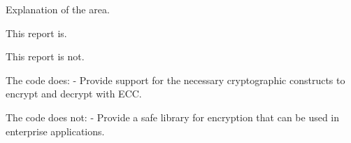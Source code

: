 Explanation of the area.

This report is.

This report is not.

The code does:
- Provide support for the necessary cryptographic constructs to encrypt and decrypt with ECC.

The code does not:
- Provide a safe library for encryption that can be used in enterprise applications.